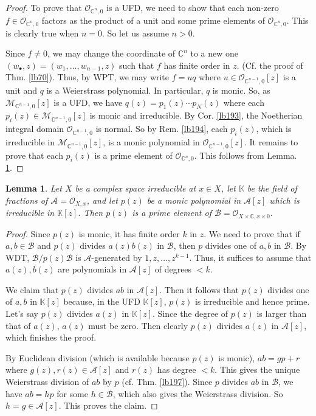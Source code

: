 \documentclass[12pt,b5paper,notitlepage]{report}
\theoremstyle{definition}
\theoremstyle{plain}
\newtheorem{lm}[df]{Lemma}
\newcommand{\scr}{\mathscr}
\newcommand{\blt}{\bullet}
\newcommand{\Kbb}{\mathbb K}
\newcommand{\Cbb}{\mathbb C}
\numberwithin{equation}{section}
\begin{document}
\begin{proof}
To prove that $\scr O_{\Cbb^n,0}$ is a UFD, we need to show that each non-zero $f\in\scr O_{\Cbb^n,0}$ factors as the product of a unit and some prime elements of $\scr O_{\Cbb^n,0}$. This is clearly true when $n=0$. So let us assume $n>0$.

Since $f\neq0$, we may change the coordinate of $\Cbb^n$ to a new one $(w_\blt,z)=(w_1,\dots,w_{n-1},z)$ such that $f$ has finite order in $z$. (Cf. the proof of Thm. \ref{lb70}). Thus, by WPT, we may write $f=uq$ where $u\in\scr O_{\Cbb^{n-1},0}[z]$ is a unit and $q$ is a Weierstrass polynomial. In particular, $q$ is monic. So, as $\scr M_{\Cbb^{n-1},0}[z]$ is a UFD, we have $q(z)=p_1(z)\cdots p_N(z)$ where each $p_i(z)\in\scr M_{\Cbb^{n-1},0}[z]$ is monic and irreducible. By Cor. \ref{lb193}, the Noetherian integral domain $\scr O_{\Cbb^{n-1},0}$ is normal. So by Rem. \ref{lb194}, each $p_i(z)$, which is irreducible in $\scr M_{\Cbb^{n-1},0}[z]$, is a monic polynomial in $\scr O_{\Cbb^{n-1},0}[z]$. It remains to prove that each $p_i(z)$ is a prime element of $\scr O_{\Cbb^n,0}$. This follows from Lemma. \ref{lb196}.
\end{proof}




\begin{lm}\label{lb196}
Let $X$ be a complex space irreducible at $x\in X$, let $\Kbb$ be the field of fractions of $\scr A=\scr O_{X,x}$, and let $p(z)$ be a monic polynomial in $\scr A[z]$ which is irreducible in $\Kbb[z]$. Then $p(z)$ is a prime element of $\scr B=\scr O_{X\times\Cbb,x\times 0}$.
\end{lm}


\begin{proof}
Since $p(z)$ is monic, it has finite order $k$ in $z$. We need to prove that if $a,b\in\scr B$ and $p(z)$ divides $a(z)b(z)$ in $\scr B$, then $p$ divides one of $a,b$ in $\scr B$. By WDT, $\scr B/p(z)\scr B$ is $\scr A$-generated by $1,z,\dots,z^{k-1}$. Thus, it suffices to assume that $a(z),b(z)$ are polynomials in $\scr A[z]$ of degrees $<k$. 

We claim that $p(z)$ divides $ab$ in $\scr A[z]$. Then it follows that $p(z)$ divides one of $a,b$ in $\Kbb[z]$ because, in the UFD $\Kbb[z]$, $p(z)$ is irreducible and hence prime. Let's say $p(z)$ divides $a(z)$ in $\Kbb[z]$. Since the degree of $p(z)$ is larger than that of $a(z)$, $a(z)$ must be zero. Then clearly $p(z)$ divides $a(z)$ in $\scr A[z]$, which finishes the proof.

By Euclidean division (which is available because $p(z)$ is monic), $ab=gp+r$ where $g(z),r(z)\in\scr A[z]$ and $r(z)$ has degree $<k$. This gives the unique Weierstrass division of $ab$ by $p$ (cf. Thm. \ref{lb197}). Since $p$ divides $ab$ in $\scr B$, we have $ab=hp$ for some $h\in\scr B$, which also gives the Weierstrass division. So $h=g\in\scr A[z]$. This proves the claim.
\end{proof}
\end{document}
